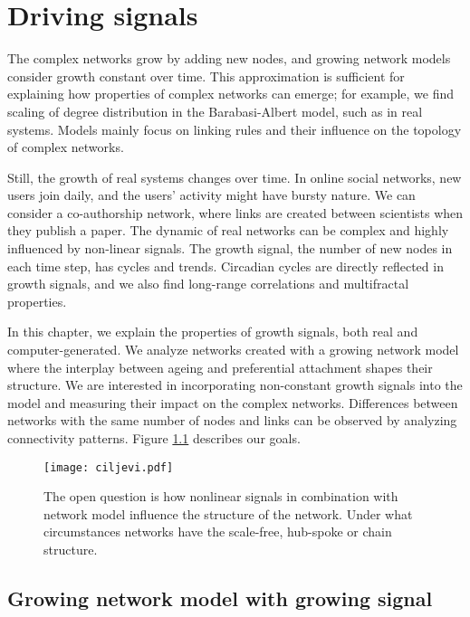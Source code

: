 
\chapter{Driving signals} %
\label{Ch:signals} %

The complex networks grow by adding new nodes, and growing network models consider growth constant over time. This approximation is sufficient for explaining how properties of complex networks can emerge; for example, we find scaling of degree distribution in the Barabasi-Albert model, such as in real systems. Models mainly focus on linking rules and their influence on the topology of complex networks. 

Still, the growth of real systems changes over time. In online social networks, new users join daily, and the users' activity might have bursty nature. We can consider a co-authorship network, where links are created between scientists when they publish a paper. The dynamic of real networks can be complex and highly influenced by non-linear signals. The growth signal, the number of new nodes in each time step, has cycles and trends. Circadian cycles are directly reflected in growth signals, and we also find long-range correlations and multifractal properties. 

In this chapter, we explain the properties of growth signals, both real and computer-generated. We analyze networks created with a growing network model where the interplay between ageing and preferential attachment shapes their structure. We are interested in incorporating non-constant growth signals into the model and measuring their impact on the complex networks. Differences between networks with the same number of nodes and links can be observed by analyzing connectivity patterns. Figure \ref{fig:ciljevi} describes our goals. 

\begin{figure}[!ht]
	\centering
	\texttt{[image: ciljevi.pdf]}
	\caption{The open question is how nonlinear signals in combination with network model influence the structure of the network. Under what circumstances networks have the scale-free, hub-spoke or chain structure. }
	\label{fig:ciljevi}
\end{figure}

\section{Growing network model with growing signal}

